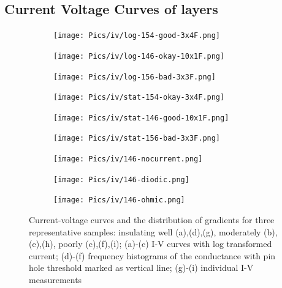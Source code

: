 \subsection{Current Voltage Curves of  layers} 
\begin{figure}
    \centering
    \begin{subfigure}{.3\textwidth}
        \texttt{[image: Pics/iv/log-154-good-3x4F.png]}
		\caption{}%
		\label{fig:iv-log-good}
    \end{subfigure}
    \begin{subfigure}{.3\textwidth}
        \texttt{[image: Pics/iv/log-146-okay-10x1F.png]}
		\caption{}%
		\label{fig:iv-log-okay}
    \end{subfigure}
    \begin{subfigure}{.3\textwidth}
        \texttt{[image: Pics/iv/log-156-bad-3x3F.png]}
		\caption{}%
		\label{fig:iv-log-bad}
    \end{subfigure}
    \begin{subfigure}{.3\textwidth}
        \texttt{[image: Pics/iv/stat-154-okay-3x4F.png]}
		\caption{}%
		\label{fig:iv-stat-good}
    \end{subfigure}
    \begin{subfigure}{.3\textwidth}
        \texttt{[image: Pics/iv/stat-146-good-10x1F.png]}
		\caption{}%
		\label{fig:iv-stat-okay}
    \end{subfigure}
    \begin{subfigure}{.3\textwidth}
        \texttt{[image: Pics/iv/stat-156-bad-3x3F.png]}
		\caption{}%
		\label{fig:iv-stat-bad}
    \end{subfigure}
    \begin{subfigure}{.3\textwidth}
        \texttt{[image: Pics/iv/146-nocurrent.png]}
		\caption{}%
		\label{fig:iv-nocurrent}
    \end{subfigure}
    \begin{subfigure}{.3\textwidth}
        \texttt{[image: Pics/iv/146-diodic.png]}
		\caption{}%
		\label{fig:iv-diodic}
    \end{subfigure}
    \begin{subfigure}{.3\textwidth}
        \texttt{[image: Pics/iv/146-ohmic.png]}
		\caption{}%
		\label{fig:iv-ohmic}
    \end{subfigure}
	\caption{
		Current-voltage curves and the distribution of gradients for three representative samples: insulating well (a),(d),(g), moderately (b),(e),(h), poorly (c),(f),(i); 
		(a)-(c) I-V curves with log transformed current; 
		(d)-(f) frequency histograms of the conductance with pin hole threshold marked as vertical line; 
		(g)-(i) individual I-V measurements
	}
    \label{fig:iv}
\end{figure}


